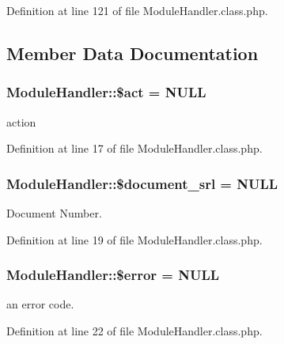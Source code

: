 Definition at line 121 of file Module\-Handler.\-class.\-php.



\subsection{Member Data Documentation}
\hypertarget{classModuleHandler_ae332c92a6ad1e9e823281d708088a0ff}{
\subsubsection[{\$act}]{\setlength{\rightskip}{0pt plus 5cm}Module\-Handler\-::\$act = N\-U\-L\-L}}\label{classModuleHandler_ae332c92a6ad1e9e823281d708088a0ff}


action 



Definition at line 17 of file Module\-Handler.\-class.\-php.

\hypertarget{classModuleHandler_acf9f6062042025aab6a7e10f6b261909}{
\subsubsection[{\$document\-\_\-srl}]{\setlength{\rightskip}{0pt plus 5cm}Module\-Handler\-::\$document\-\_\-srl = N\-U\-L\-L}}\label{classModuleHandler_acf9f6062042025aab6a7e10f6b261909}


Document Number. 



Definition at line 19 of file Module\-Handler.\-class.\-php.

\hypertarget{classModuleHandler_ad81b78f21e42724e73da6808c561159c}{
\subsubsection[{\$error}]{\setlength{\rightskip}{0pt plus 5cm}Module\-Handler\-::\$error = N\-U\-L\-L}}\label{classModuleHandler_ad81b78f21e42724e73da6808c561159c}


an error code. 



Definition at line 22 of file Module\-Handler.\-class.\-php.


